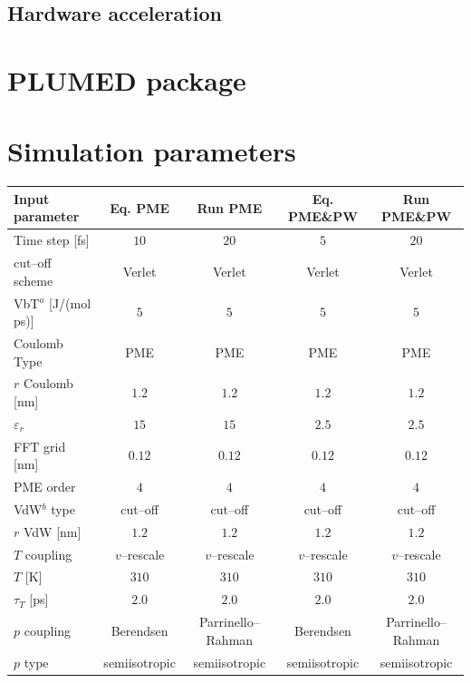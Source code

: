 \subsection{Hardware acceleration}


\section{PLUMED package}

\section{Simulation parameters}


\begin{table}[h!t]
	\centering\footnotesize
	\begin{tabular}{lcccc}
		\toprule
		Input parameter & Eq. \acs{PME} & Run \acs{PME} & Eq. \acs{PME}\&\acs{PW} & Run \acs{PME}\&\acs{PW} \\ \toprule
		Time step [fs]		&	$10$ & $20$ & $5$ & $20$ \\ \midrule
		cut--off scheme		& Verlet & Verlet & Verlet & Verlet \\ \midrule
		VbT$^a$ [J/(mol ps)]& $5$ & $5$ & $5$ & $5$ \\ \midrule
		Coulomb Type		& \acs{PME}	& \acs{PME}	& \acs{PME} & \acs{PME} \\ \midrule
		$r$ Coulomb	[nm]	& $1.2$ & $1.2$ & $1.2$ & $1.2$ \\ \midrule
		$\varepsilon_r$		& $15$ & $15$ & $2.5$ & $2.5$ \\ \midrule
		\acs{FFT} grid [nm]	& $0.12$ & $0.12$ & $0.12$ & $0.12$ \\ \midrule
	    \acs{PME} order		& $4$ & $4$ & $4$ & $4$ \\ \midrule
		VdW$^b$ type		& cut--off & cut--off & cut--off & cut--off \\ \midrule
		$r$ VdW [nm]		& $1.2$ & $1.2$ & $1.2$ & $1.2$ \\ \midrule
		$T$ coupling		& $v$--rescale & $v$--rescale & $v$--rescale & $v$--rescale \\ \midrule
		$T$ [K]				& $310$ & $310$ & $310$ & $310$  \\ \midrule
		$\tau_T$ [ps]		& $2.0$ & $2.0$ & $2.0$ & $2.0$ \\ \midrule
		$p$ coupling		& Berendsen & Parrinello--Rahman & Berendsen & Parrinello--Rahman \\ \midrule
		$p$ type			& semiisotropic & semiisotropic & semiisotropic & semiisotropic \\ \midrule

\end{tabular}
\end{table}

